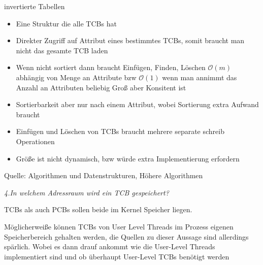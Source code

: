 \documentclass{article}
\begin{document}
invertierte Tabellen
\begin{itemize}
\item[+] Eine Struktur die alle TCBs hat 
\item[+] Direkter Zugriff auf Attribut eines bestimmtes TCBs, somit braucht man
	nicht das gesamte TCB laden
\item[+-] Wenn nicht sortiert dann braucht Einfügen, Finden, Löschen
	$\mathcal{O}(m)$ abhängig von Menge an Attribute bzw $\mathcal{O}(1)$
	wenn man annimmt das Anzahl an Attributen beliebig Groß aber Konsitent
	ist
\item[+-] Sortierbarkeit aber nur nach einem Attribut, wobei Sortierung extra
	Aufwand braucht
\item[-] Einfügen und Löschen von TCBs braucht mehrere separate schreib
	Operationen
\item[-] Größe ist nicht dynamisch, bzw würde extra Implementierung erfordern
\end{itemize}
Quelle: Algorithmen und Datenstrukturen, Höhere Algorithmen


\vspace{0.5cm} \noindent\textit{4.In welchem Adressraum wird ein TCB
gespeichert?} \vspace{0.5cm}

TCBs als auch PCBs sollen beide im Kernel Speicher liegen.

Möglicherweiße können TCBs von User Level Threads im Prozess eigenen
Speicherbereich gehalten werden, die Quellen zu dieser Aussage sind allerdings
spärlich. Wobei es dann drauf ankommt wie die User-Level Threads implementiert
sind und ob überhaupt User-Level TCBs benötigt werden


\end{document}
